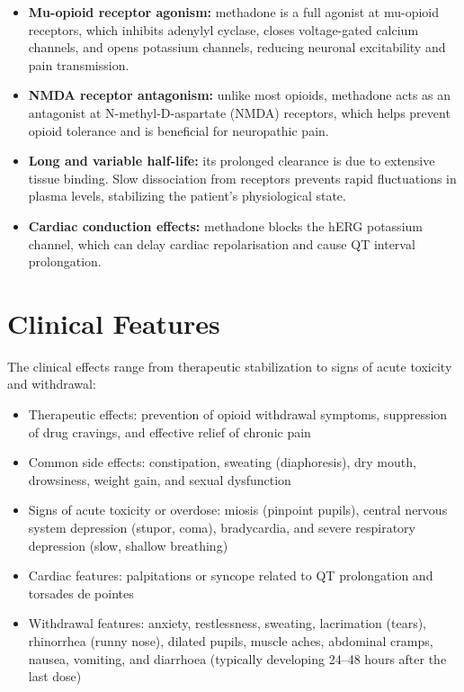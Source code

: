 \begin{itemize}
    \item \textbf{Mu-opioid receptor agonism:} methadone is a full agonist at mu-opioid receptors, which inhibits adenylyl cyclase, closes voltage-gated calcium channels, and opens potassium channels, reducing neuronal excitability and pain transmission.
    \item \textbf{NMDA receptor antagonism:} unlike most opioids, methadone acts as an antagonist at N-methyl-D-aspartate (NMDA) receptors, which helps prevent opioid tolerance and is beneficial for neuropathic pain.
    \item \textbf{Long and variable half-life:} its prolonged clearance is due to extensive tissue binding. Slow dissociation from receptors prevents rapid fluctuations in plasma levels, stabilizing the patient's physiological state.
    \item \textbf{Cardiac conduction effects:} methadone blocks the hERG potassium channel, which can delay cardiac repolarisation and cause QT interval prolongation.
\end{itemize}

\section*{Clinical Features}
The clinical effects range from therapeutic stabilization to signs of acute toxicity and withdrawal:

\begin{itemize}
    \item Therapeutic effects: prevention of opioid withdrawal symptoms, suppression of drug cravings, and effective relief of chronic pain
    \item Common side effects: constipation, sweating (diaphoresis), dry mouth, drowsiness, weight gain, and sexual dysfunction
    \item Signs of acute toxicity or overdose: miosis (pinpoint pupils), central nervous system depression (stupor, coma), bradycardia, and severe respiratory depression (slow, shallow breathing)
    \item Cardiac features: palpitations or syncope related to QT prolongation and torsades de pointes
    \item Withdrawal features: anxiety, restlessness, sweating, lacrimation (tears), rhinorrhea (runny nose), dilated pupils, muscle aches, abdominal cramps, nausea, vomiting, and diarrhoea (typically developing 24--48 hours after the last dose)
\end{itemize}


